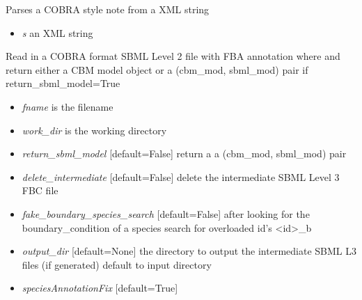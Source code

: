 \documentclass[a4paper,11pt,english]{sphinxmanual}
\begin{document}

\begin{fulllineitems}
\label{modules_doc:cbmpy.CBXML.sbml_readCOBRANote}
Parses a COBRA style note from a XML string
\begin{itemize}
\item {} 
\emph{s} an XML string

\end{itemize}

\end{fulllineitems}


\begin{fulllineitems}
\label{modules_doc:cbmpy.CBXML.sbml_readCOBRASBML}
Read in a COBRA format SBML Level 2 file with FBA annotation where and return either a CBM model object
or a (cbm\_mod, sbml\_mod) pair if return\_sbml\_model=True
\begin{itemize}
\item {} 
\emph{fname} is the filename

\item {} 
\emph{work\_dir} is the working directory

\item {} 
\emph{return\_sbml\_model} {[}default=False{]} return a a (cbm\_mod, sbml\_mod) pair

\item {} 
\emph{delete\_intermediate} {[}default=False{]} delete the intermediate SBML Level 3 FBC file

\item {} 
\emph{fake\_boundary\_species\_search} {[}default=False{]} after looking for the boundary\_condition of a species search for overloaded id's \textless{}id\textgreater{}\_b

\item {} 
\emph{output\_dir} {[}default=None{]} the directory to output the intermediate SBML L3 files (if generated) default to input directory

\item {} 
\emph{speciesAnnotationFix} {[}default=True{]}

\end{itemize}

\end{fulllineitems}
\end{document}
